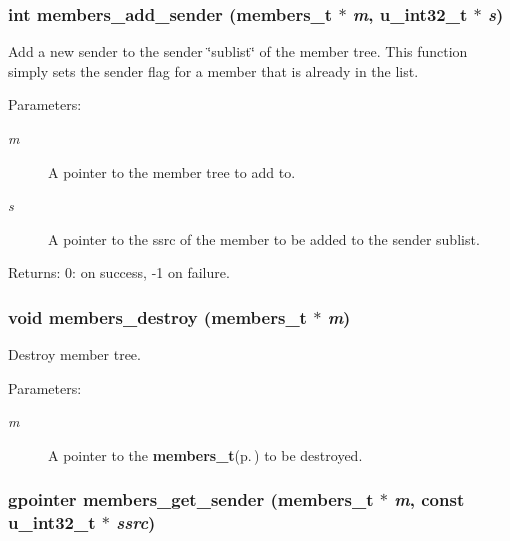 \subsubsection{\setlength{\rightskip}{0pt plus 5cm}int members\_\-add\_\-sender ({\bf members\_\-t} $\ast$ {\em m}, u\_\-int32\_\-t $\ast$ {\em s})}\label{members_8c_a7}


Add a new sender to the sender \char`\"{}sublist\char`\"{} of the member tree. This function simply sets the sender flag for a member that is already in the list. \begin{Desc}
\item[Parameters:]
\begin{description}
\item[{\em m}]A pointer to the member tree to add to. \item[{\em s}]A pointer to the ssrc of the member to be added to the sender sublist. \end{description}
\end{Desc}
\begin{Desc}
\item[Returns:]0: on success, -1 on failure. \end{Desc}
\subsubsection{\setlength{\rightskip}{0pt plus 5cm}void members\_\-destroy ({\bf members\_\-t} $\ast$ {\em m})}\label{members_8c_a4}


Destroy member tree. \begin{Desc}
\item[Parameters:]
\begin{description}
\item[{\em m}]A pointer to the {\bf members\_\-t}{\rm (p.\,\pageref{structmembers__t})} to be destroyed. \end{description}
\end{Desc}
\subsubsection{\setlength{\rightskip}{0pt plus 5cm}gpointer members\_\-get\_\-sender ({\bf members\_\-t} $\ast$ {\em m}, const u\_\-int32\_\-t $\ast$ {\em ssrc})}\label{members_8c_a13}



